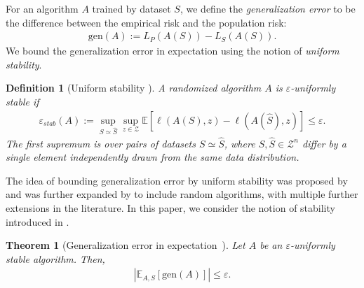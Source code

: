 \documentclass{article}
\newtheorem{theorem}{Theorem}
\newtheorem{definition}{Definition}
\begin{document}
For an algorithm $A$ trained by dataset $S$, we define the \textit{generalization error} to be the difference between the empirical risk and the population risk:
\begin{align*}
    \mathrm{gen}(A) := L_P(A(S)) - L_S(A(S)).
\end{align*}
We bound the generalization error in expectation using the notion of \textit{uniform stability}.

\begin{definition}[Uniform stability {\citep[Definition 2.1]{Hardt}}]\label{def:unifstab}
    A randomized algorithm $A$ is $\varepsilon$-uniformly stable if
    \begin{align*}
        \varepsilon_{stab}(A) \!:=\! \sup_{S \simeq \widehat{S}} \sup_{z \in \mathcal{Z} } \mathbb{E} \left[\ell(A(S), z) \!-\! \ell(A(\widehat{S}), z)\right] \!\leq\! \varepsilon.
    \end{align*}
    The first supremum is over pairs of datasets $S \simeq \widehat{S}$, where $S,\widehat{S} \in \mathcal{Z}^n$ differ by a single element independently drawn from the same data distribution.
\end{definition}

The idea of bounding generalization error by uniform stability was  proposed by \citet{Bousquet} and was further expanded by \citet{Elisseeff} to include random algorithms, with multiple further extensions in the literature. In this paper, we consider the notion of stability introduced in \citet{Hardt}.

\begin{theorem}[Generalization error in expectation~{\citep[Theorem 2.2]{Hardt}}]\label{thm:stabandgen}
    Let $A$ be an $\varepsilon$-uniformly stable algorithm. Then,
    \begin{align*}
        |\mathbb{E}_{A, S} [\mathrm{gen}(A)]| \leq \varepsilon.
    \end{align*}
\end{theorem}
\end{document}
